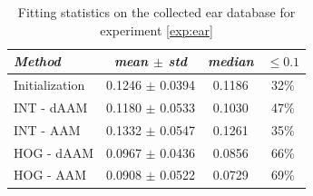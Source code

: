 \begin{table}[h]
\small
\centering
\begin{tabular}{|l|c|c|c|}
\hline
\emph{Method}   & \emph{mean $\pm$ std} & \emph{median} & $\leq 0.1$\\
\hline\hline
Initialization  & 0.1246 $\pm$ 0.0394 & 0.1186 & 32\%\\
INT - dAAM      & 0.1180 $\pm$ 0.0533 & 0.1030 & 47\%\\
INT - AAM       & 0.1332 $\pm$ 0.0547 & 0.1261 & 35\%\\
HOG - dAAM      & 0.0967 $\pm$ 0.0436 & 0.0856 & 66\%\\
HOG - AAM       & 0.0908 $\pm$ 0.0522 & 0.0729 & 69\%\\
\hline
\end{tabular}
\caption{Fitting statistics on the collected ear database for experiment \ref{exp:ear}}
\label{tab:ear_stats}
\end{table}





